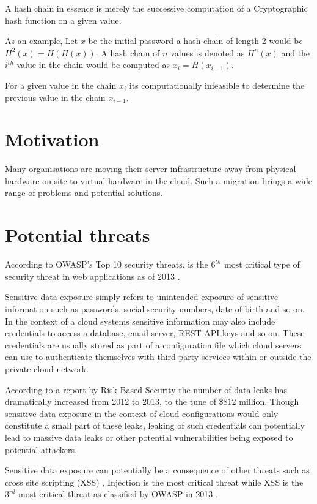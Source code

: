 \documentclass{sig-alternate-05-2015}
\begin{document}
A hash chain in essence is merely the successive computation of a Cryptographic hash function on a given value. 

As an example, Let $x$ be the initial password a hash chain of length 2 would be $H^{2}(x) = H(H(x))$. A hash chain of $n$ values is denoted as $H^{n}(x)$ and the $i^{th}$ value in the chain would be computed as $x_{i} = H(x_{i-1})$.

For a given value in the chain $x_{i}$ its computationally infeasible to determine the previous value in the chain $x_{i-1}$.

\section*{Motivation}

Many organisations are moving their server infrastructure away from physical hardware on-site to virtual hardware in the cloud. Such a migration brings a wide range of problems and potential solutions. 

\section*{Potential threats}

According to OWASP's Top 10 security threats,  is the $6^{th}$ most critical type of security threat in web applications as of 2013 \cite{wichers_owasp_2014}. 

Sensitive data exposure simply refers to unintended exposure of sensitive information such as passwords, social security numbers, date of birth and so on. In the context of a cloud systems sensitive information may also include credentials to access a database, email server, REST API keys and so on. These credentials are usually stored as part of a configuration file which cloud servers can use to authenticate themselves with third party services within or outside the private cloud network. 

According to a report by Risk Based Security \cite{risk_based_executives_2014} \cite{shu_privacy-preserving_2015} the number of data leaks has dramatically increased from 2012 to 2013, to the tune of \$812 million. Though sensitive data exposure in the context of cloud configurations would only constitute a small part of these leaks, leaking of such credentials can potentially lead to massive data leaks or other potential vulnerabilities being exposed to potential attackers.

Sensitive data exposure can potentially be a consequence of other threats such as cross site scripting (XSS) \cite{louw_blueprint:_2009}, Injection is the most critical threat while XSS is the $3^{rd}$ most critical threat as classified by OWASP in 2013 \cite{wichers_owasp_2014}. 
\end{document}
